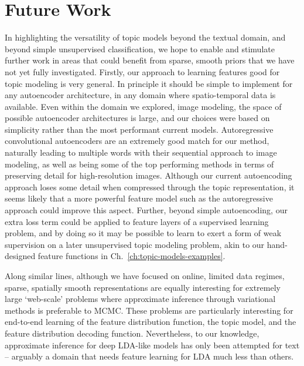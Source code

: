 \section{Future Work} \label{sec:conclusion-future-work}
In highlighting the versatility of topic models beyond the textual domain, and beyond simple unsupervised classification, we hope to enable and stimulate further work in areas that could benefit from sparse, smooth priors that we have not yet fully investigated. Firstly, our approach to learning features good for topic modeling is very general. In principle it should be simple to implement for any autoencoder architecture, in any domain where spatio-temporal data is available. Even within the domain we explored, image modeling, the space of possible autoencoder architectures is large, and our choices were based on simplicity rather than the most performant current models. Autoregressive convolutional autoencoders are an extremely good match for our method, naturally leading to multiple words with their sequential approach to image modeling, as well as being some of the top performing methods in terms of preserving detail for high-resolution images. Although our current autoencoding approach loses some detail when compressed through the topic representation, it seems likely that a more powerful feature model such as the autoregressive approach could improve this aspect. Further, beyond simple autoencoding, our extra loss term could be applied to feature layers of a supervised learning problem, and by doing so it may be possible to learn to exert a form of weak supervision on a later unsupervised topic modeling problem, akin to our hand-designed feature functions in Ch.~\ref{ch:topic-models-examples}.

Along similar lines, although we have focused on online, limited data regimes, sparse, spatially smooth representations are equally interesting for extremely large `web-scale' problems where approximate inference through variational methods is preferable to MCMC. These problems are particularly interesting for end-to-end learning of the feature distribution function, the topic model, and the feature distribution decoding function. Nevertheless, to our knowledge, approximate inference for deep LDA-like models has only been attempted for text -- arguably a domain that needs feature learning for LDA much less than others.


